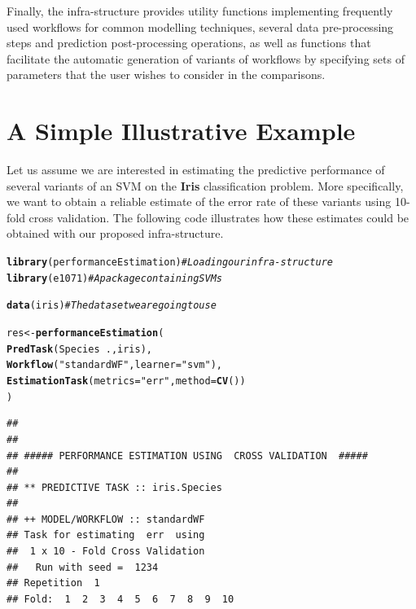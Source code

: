 \documentclass[10pt,a4paper]{article}\usepackage[]{graphicx}\usepackage[]{color}
\makeatletter
\newcommand{\hlstr}[1]{\textcolor[rgb]{0.192,0.494,0.8}{#1}}%
\newcommand{\hlcom}[1]{\textcolor[rgb]{0.678,0.584,0.686}{\textit{#1}}}%
\newcommand{\hlopt}[1]{\textcolor[rgb]{0,0,0}{#1}}%
\newcommand{\hlstd}[1]{\textcolor[rgb]{0.345,0.345,0.345}{#1}}%
\newcommand{\hlkwb}[1]{\textcolor[rgb]{0.69,0.353,0.396}{#1}}%
\newcommand{\hlkwc}[1]{\textcolor[rgb]{0.333,0.667,0.333}{#1}}%
\newcommand{\hlkwd}[1]{\textcolor[rgb]{0.737,0.353,0.396}{\textbf{#1}}}%
\newenvironment{kframe}{%
 \def\at@end@of@kframe{}%
 \ifinner\ifhmode%
  \def\at@end@of@kframe{\end{minipage}}%
  \begin{minipage}{\columnwidth}%
 \fi\fi%
 \def\FrameCommand##1{\hskip\@totalleftmargin \hskip-\fboxsep
 \colorbox{shadecolor}{##1}\hskip-\fboxsep
     \hskip-\linewidth \hskip-\@totalleftmargin \hskip\columnwidth}%
 \MakeFramed {\advance\hsize-\width
   \@totalleftmargin\z@ \linewidth\hsize
   \@setminipage}}%
 {\par\unskip\endMakeFramed%
 \at@end@of@kframe}
\newenvironment{knitrout}{}{} %
\makeatother
\begin{document}
Finally, the infra-structure provides utility functions
implementing frequently used workflows for common modelling techniques, several data pre-processing steps and prediction post-processing operations, as
well as functions that facilitate the automatic generation of variants
of workflows by specifying sets of parameters that the user wishes to
consider in the comparisons.

\section{A Simple Illustrative Example}\label{sec:simpleEx}

Let us assume we are interested in estimating the predictive performance of several variants of
an SVM on the
\textbf{Iris} classification problem. More specifically, we want to
obtain a reliable estimate of the error rate of these variants using
10-fold cross validation. The following code illustrates how these
estimates could be obtained with our proposed infra-structure.

\begin{knitrout}\footnotesize
{}\color{fgcolor}\begin{kframe}
\begin{alltt}
\hlkwd{library}\hlstd{(performanceEstimation)}  \hlcom{# Loading our infra-structure}
\hlkwd{library}\hlstd{(e1071)}                  \hlcom{# A package containing SVMs}

\hlkwd{data}\hlstd{(iris)}                      \hlcom{# The data set we are going to use}

\hlstd{res} \hlkwb{<-} \hlkwd{performanceEstimation}\hlstd{(}
         \hlkwd{PredTask}\hlstd{(Species} \hlopt{~} \hlstd{.,iris),}
         \hlkwd{Workflow}\hlstd{(}\hlstr{"standardWF"}\hlstd{,}\hlkwc{learner}\hlstd{=}\hlstr{"svm"}\hlstd{),}
         \hlkwd{EstimationTask}\hlstd{(}\hlkwc{metrics}\hlstd{=}\hlstr{"err"}\hlstd{,}\hlkwc{method}\hlstd{=}\hlkwd{CV}\hlstd{())}
         \hlstd{)}
\end{alltt}
\begin{verbatim}
## 
## 
## ##### PERFORMANCE ESTIMATION USING  CROSS VALIDATION  #####
## 
## ** PREDICTIVE TASK :: iris.Species
## 
## ++ MODEL/WORKFLOW :: standardWF 
## Task for estimating  err  using
##  1 x 10 - Fold Cross Validation
## 	 Run with seed =  1234 
## Repetition  1 
## Fold:  1  2  3  4  5  6  7  8  9  10
\end{verbatim}
\end{kframe}
\end{knitrout}
\end{document}

